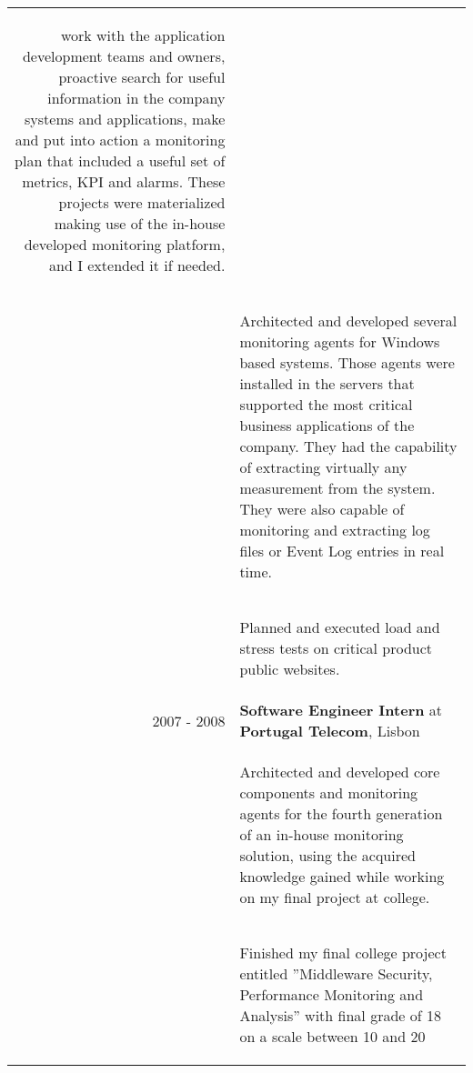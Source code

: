 \documentclass[a4paper,10pt]{article}
\begin{document}
\begin{tabular}{rp{11cm}}
\begin{compactitem}
work with the application development teams and owners, proactive search
for useful information in the company systems and applications, make and
put into action a monitoring plan that included a useful set of metrics, KPI
and alarms. These projects were materialized making use of the in-house
developed monitoring platform, and I extended it if needed.
     \end{compactitem}\vspace{-1em} \\
  & \begin{compactitem} 
     \item
     Architected and developed several monitoring agents for Windows based
systems. Those agents were installed in the servers that supported the
most critical business applications of the company. They had the capability
of extracting virtually any measurement from the system. They were also
capable of monitoring and extracting log files or Event Log entries in real
time.
     \end{compactitem}\vspace{-1em} \\
  & \begin{compactitem} 
     \item Planned and executed load and stress tests on critical product public websites.
     \end{compactitem}\vspace{-1em} \\
  \textsc{2007 - 2008} & \textbf{Software Engineer Intern} at \textbf{Portugal Telecom}, Lisbon\\ 
   & \begin{compactitem}
   \item
   Architected and developed core components and monitoring agents for the
fourth generation of an in-house monitoring solution, using the acquired
knowledge gained while working on my final project at college.
   \end{compactitem}\vspace{-1em} \\
  & \begin{compactitem}
   \item
   Finished my final college project entitled ”Middleware Security, Performance
Monitoring and Analysis” with final grade of 18 on a scale between 10 and
20
   \end{compactitem}\vspace{-1em} \\

\end{tabular}
\end{document}

